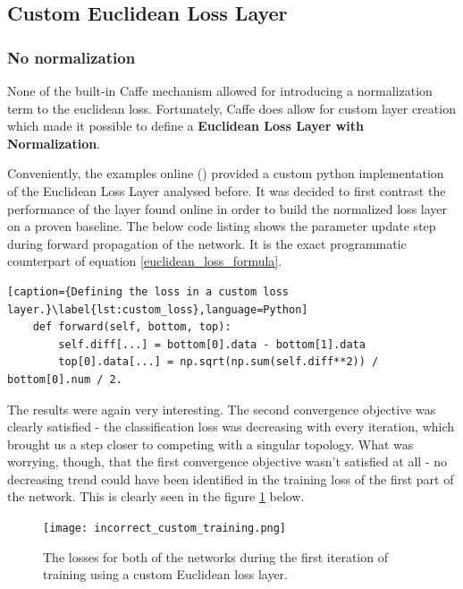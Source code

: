 \documentclass[a4paper, 12pt]{article}
\numberwithin{equation}{section}
\begin{document}
	\subsection{Custom Euclidean Loss Layer}
	
	\subsubsection{No normalization}
	
	None of the built-in Caffe mechanism allowed for introducing a normalization term to the euclidean loss. Fortunately, Caffe does allow for custom layer creation which made it possible to define a \textbf{Euclidean Loss Layer with Normalization}.
	
	Conveniently, the examples online (\cite{caffe2016loss}) provided a custom python implementation of the Euclidean Loss Layer analysed before. It was decided to first contrast the performance of the layer found online in order to build the normalized loss layer on a proven baseline. The below code listing shows the parameter update step during forward propagation of the network. It is the exact programmatic counterpart of equation \ref{euclidean_loss_formula}.
	
	\begin{lstlisting}[caption={Defining the loss in a custom loss layer.}\label{lst:custom_loss},language=Python]
	def forward(self, bottom, top):
	    self.diff[...] = bottom[0].data - bottom[1].data
	    top[0].data[...] = np.sqrt(np.sum(self.diff**2)) / bottom[0].num / 2.
	\end{lstlisting}
	
	The results were again very interesting. The second convergence objective was clearly satisfied - the classification loss was decreasing with every iteration, which brought us a step closer to competing with a singular topology. What was worrying, though, that the first convergence objective wasn't satisfied at all - no decreasing trend could have been identified in the training loss of the first part of the network. This is clearly seen in the figure \ref{fig:incorrect_custom_training} below.
	
	\begin{figure}[!h]
		\centering
		\texttt{[image: incorrect\_custom\_training.png]}
		\caption{\label{fig:incorrect_custom_training}{The losses for both of the networks during the first iteration of training using a custom Euclidean loss layer.}}
	\end{figure}
\end{document}
